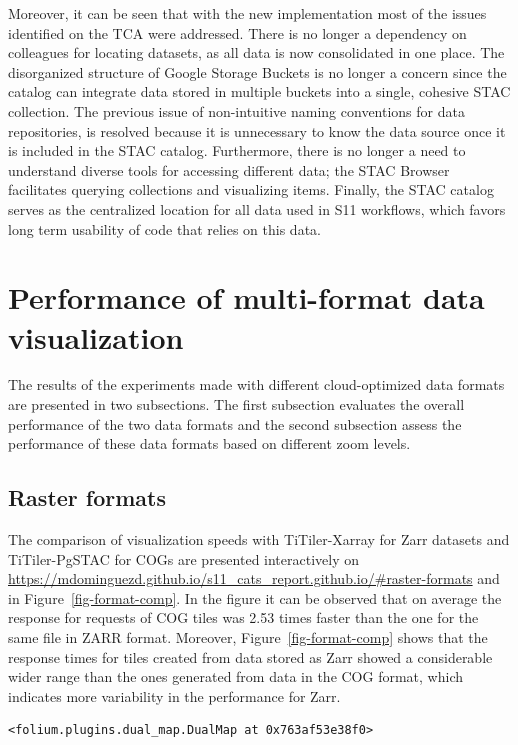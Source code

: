 \documentclass[
  oneside,
  open=any]{scrbook}
\begin{document}
Moreover, it can be seen that with the new implementation most of the
issues identified on the TCA were addressed. There is no longer a
dependency on colleagues for locating datasets, as all data is now
consolidated in one place. The disorganized structure of Google Storage
Buckets is no longer a concern since the catalog can integrate data
stored in multiple buckets into a single, cohesive STAC collection. The
previous issue of non-intuitive naming conventions for data
repositories, is resolved because it is unnecessary to know the data
source once it is included in the STAC catalog. Furthermore, there is no
longer a need to understand diverse tools for accessing different data;
the STAC Browser facilitates querying collections and visualizing items.
Finally, the STAC catalog serves as the centralized location for all
data used in S11 workflows, which favors long term usability of code
that relies on this data.

\section{Performance of multi-format data
visualization}\label{performance-of-multi-format-data-visualization}

The results of the experiments made with different cloud-optimized data
formats are presented in two subsections. The first subsection evaluates
the overall performance of the two data formats and the second
subsection assess the performance of these data formats based on
different zoom levels.

\subsection{Raster formats}\label{raster-formats}

The comparison of visualization speeds with TiTiler-Xarray for Zarr
datasets and TiTiler-PgSTAC for COGs are presented interactively on
\url{https://mdominguezd.github.io/s11_cats_report.github.io/\#raster-formats}
and in Figure~\ref{fig-format-comp}. In the figure it can be observed
that on average the response for requests of COG tiles was 2.53 times
faster than the one for the same file in ZARR format. Moreover,
Figure~\ref{fig-format-comp} shows that the response times for tiles
created from data stored as Zarr showed a considerable wider range than
the ones generated from data in the COG format, which indicates more
variability in the performance for Zarr.

\begin{verbatim}
<folium.plugins.dual_map.DualMap at 0x763af53e38f0>
\end{verbatim}
\end{document}
